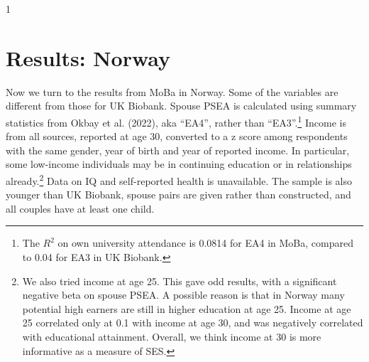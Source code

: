 \documentclass[
  12pt,
]{article}
\theoremstyle{definition}
\theoremstyle{definition}
\theoremstyle{definition}
\theoremstyle{definition}
\theoremstyle{remark}
\begin{document}
\begin{table}[ht]
\begin{centerbox}
\begin{threeparttable}
\begin{tabularx}{1\textwidth}
 \tabularnewline[-0.5pt]


\hhline{}
\end{tabularx}
\end{threeparttable}\par\end{centerbox}

\end{table}
 

\FloatBarrier

\section{Results: Norway}\label{results-norway}

Now we turn to the results from MoBa in Norway. Some of the variables
are different from those for UK Biobank. Spouse PSEA is calculated using
summary statistics from {Okbay et al.} (2022), aka ``EA4'', rather than
``EA3''.\footnote{The \(R^2\) on own university attendance is
  0.0814 for EA4 in MoBa, compared to
  0.04 for EA3 in UK Biobank.} Income is from all sources, reported at age 30, converted to
a z score among respondents with the same gender, year of birth and year
of reported income. In particular, some low-income individuals may be in
continuing education or in relationships already.\footnote{We also tried income at age 25. This gave odd results, with a
  significant negative beta on spouse PSEA. A possible reason is that
  in Norway many potential high earners are still in higher education
  at age 25. Income at age 25 correlated only at 0.1 with income at
  age 30, and was negatively correlated with educational attainment.
  Overall, we think income at 30 is more informative as a measure of
  SES.} Data on IQ and
self-reported health is unavailable. The sample is also younger than UK
Biobank, spouse pairs are given rather than constructed, and all couples
have at least one child.
\end{document}
